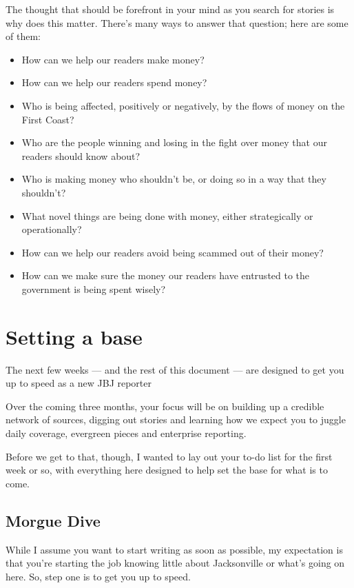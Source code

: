 \documentclass[
  12pt,
  american,
  letterpaperpaper,
  extrafontsizes,onecolumn,openright
  ]{memoir}
\providecommand{\tightlist}{%
  \setlength{\itemsep}{0pt}\setlength{\parskip}{0pt}}
\begin{document}
The thought that should be forefront in your mind as you search for stories is why does this matter. There's many ways to answer that question; here are some of them:

\begin{itemize}
\tightlist
\item
  How can we help our readers make money?
\item
  How can we help our readers spend money?
\item
  Who is being affected, positively or negatively, by the flows of money on the First Coast?
\item
  Who are the people winning and losing in the fight over money that our readers should know about?
\item
  Who is making money who shouldn't be, or doing so in a way that they shouldn't?
\item
  What novel things are being done with money, either strategically or operationally?
\item
  How can we help our readers avoid being scammed out of their money?
\item
  How can we make sure the money our readers have entrusted to the government is being spent wisely?
\end{itemize}

\hypertarget{setting-a-base}{%
\chapter{Setting a base}\label{setting-a-base}}

The next few weeks --- and the rest of this document --- are designed to get you up to speed as a new JBJ reporter

Over the coming three months, your focus will be on building up a credible network of sources, digging out stories and learning how we expect you to juggle daily coverage, evergreen pieces and enterprise reporting.

Before we get to that, though, I wanted to lay out your to-do list for the first week or so, with everything here designed to help set the base for what is to come.

\hypertarget{morgue-dive}{%
\section*{Morgue Dive}\label{morgue-dive}}

While I assume you want to start writing as soon as possible, my expectation is that you're starting the job knowing little about Jacksonville or what's going on here. So, step one is to get you up to speed.
\end{document}
